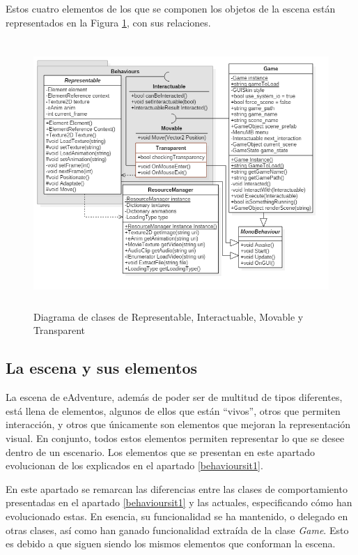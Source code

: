 Estos cuatro elementos de los que se componen los objetos de la escena están representados en la Figura \ref{behavioursit2}, con sus relaciones.

\begin{figure}[h!]
	\centerline{\includegraphics[height=4in]{figures/it2/Behaviours.png}}
	\caption[Representable, Interactuable, Movable y Transparent - Versión Final]{Diagrama de clases de Representable, Interactuable, Movable y Transparent}
	\label{behavioursit2}
\end{figure}

\newpage

\subsection{La escena y sus elementos}

La escena de eAdventure, además de poder ser de multitud de tipos diferentes, está llena de elementos, algunos de ellos que están ``vivos'', otros que permiten interacción, y otros que únicamente son elementos que mejoran la representación visual. En conjunto, todos estos elementos permiten representar lo que se desee dentro de un escenario. Los elementos que se presentan en este apartado evolucionan de los explicados en el apartado \ref{behavioursit1}.

En este apartado se remarcan las diferencias entre las clases de comportamiento presentadas en el apartado \ref{behavioursit1} y las actuales, especificando cómo han evolucionado estas. En esencia, su funcionalidad se ha mantenido, o delegado en otras clases, así como han ganado funcionalidad extraída de la clase \textit{Game}. Esto es debido a que siguen siendo los mismos elementos que conforman la escena.

